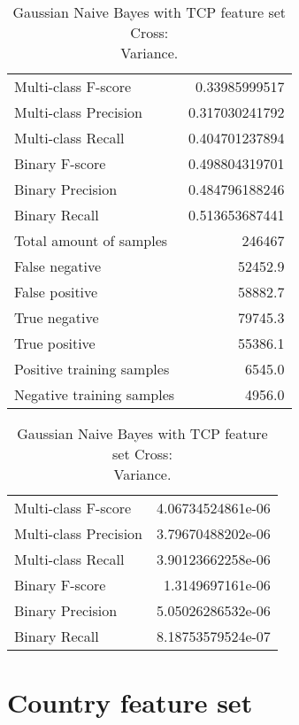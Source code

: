 \begin{table}[H]
\begin{minipage}{0.5\textwidth}
\caption{Gaussian Naive Bayes with TCP feature set Cross: \\Average.}
\centering
\begin{tabular}{l r}
\toprule
Multi-class F-score & 0.33985999517 \\
Multi-class Precision & 0.317030241792 \\
Multi-class Recall & 0.404701237894 \\
\midrule
Binary F-score & 0.498804319701 \\
Binary Precision & 0.484796188246 \\
Binary Recall & 0.513653687441 \\
\midrule
Total amount of samples & 246467 \\
False negative & 52452.9 \\
False positive & 58882.7 \\
True negative & 79745.3 \\
True positive & 55386.1 \\
\midrule
Positive training samples & 6545.0 \\
Negative training samples & 4956.0 \\
\bottomrule
\end{tabular}
\end{minipage}
\hfillx
\begin{minipage}{0.5\textwidth}
\caption{Gaussian Naive Bayes with TCP feature set Cross: \\Variance.}
\centering
\begin{tabular}{l r}
\toprule
Multi-class F-score & 4.06734524861e-06 \\
Multi-class Precision & 3.79670488202e-06 \\
Multi-class Recall & 3.90123662258e-06 \\
\midrule
Binary F-score & 1.3149697161e-06 \\
Binary Precision & 5.05026286532e-06 \\
Binary Recall & 8.18753579524e-07 \\
\bottomrule
\end{tabular}
\end{minipage}
\end{table}


\newpage
\section{Country feature set}
